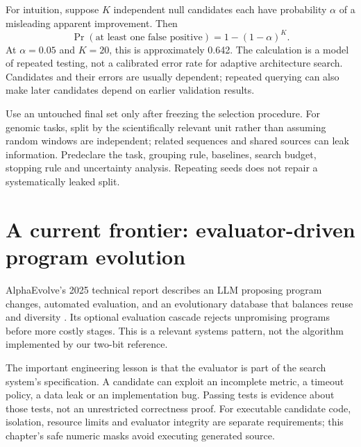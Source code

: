 For intuition, suppose $K$ independent null candidates each have probability
$\alpha$ of a misleading apparent improvement. Then
\begin{equation}
 \Pr(\text{at least one false positive})=1-(1-\alpha)^K.
 \label{eq:multiple}
\end{equation}
At $\alpha=0.05$ and $K=20$, this is approximately 0.642.
The calculation is a model of repeated testing, not a calibrated error
rate for adaptive architecture search. Candidates and their errors are
usually dependent; repeated querying can also make later candidates
depend on earlier validation results.


Use an untouched final set only after freezing the selection procedure.
For genomic tasks, split by the scientifically relevant unit rather than
assuming random windows are independent; related sequences and shared
sources can leak information. Predeclare the task, grouping rule, baselines,
search budget, stopping rule and uncertainty analysis. Repeating seeds
does not repair a systematically leaked split.

\section{A current frontier: evaluator-driven program evolution}
AlphaEvolve's 2025 technical report describes an LLM proposing program
changes, automated evaluation, and an evolutionary database that balances
reuse and diversity \cite{alphaevolve}. Its optional evaluation cascade
rejects unpromising programs before more costly stages. This is a relevant
systems pattern, not the algorithm implemented by our two-bit reference.

The important engineering lesson is that the evaluator is part of the
search system's specification. A candidate can exploit an incomplete metric,
a timeout policy, a data leak or an implementation bug. Passing tests is
evidence about those tests, not an unrestricted correctness proof.
For executable candidate code, isolation, resource limits and evaluator
integrity are separate requirements; this chapter's safe numeric masks
avoid executing generated source.

